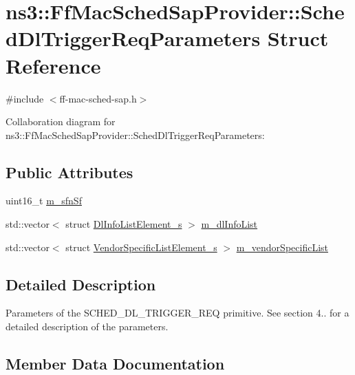 \hypertarget{structns3_1_1FfMacSchedSapProvider_1_1SchedDlTriggerReqParameters}{}\section{ns3\+:\+:Ff\+Mac\+Sched\+Sap\+Provider\+:\+:Sched\+Dl\+Trigger\+Req\+Parameters Struct Reference}
\label{structns3_1_1FfMacSchedSapProvider_1_1SchedDlTriggerReqParameters}


{\ttfamily \#include $<$ff-\/mac-\/sched-\/sap.\+h$>$}



Collaboration diagram for ns3\+:\+:Ff\+Mac\+Sched\+Sap\+Provider\+:\+:Sched\+Dl\+Trigger\+Req\+Parameters\+:
\subsection*{Public Attributes}
\begin{DoxyCompactItemize}
\item 
uint16\+\_\+t \hyperlink{structns3_1_1FfMacSchedSapProvider_1_1SchedDlTriggerReqParameters_a7689a56aa4563c5cc83b92f596ac43e8}{m\+\_\+sfn\+Sf}
\item 
std\+::vector$<$ struct \hyperlink{structns3_1_1DlInfoListElement__s}{Dl\+Info\+List\+Element\+\_\+s} $>$ \hyperlink{structns3_1_1FfMacSchedSapProvider_1_1SchedDlTriggerReqParameters_abe582862ee05e494899cfeb12787c2fc}{m\+\_\+dl\+Info\+List}
\item 
std\+::vector$<$ struct \hyperlink{structns3_1_1VendorSpecificListElement__s}{Vendor\+Specific\+List\+Element\+\_\+s} $>$ \hyperlink{structns3_1_1FfMacSchedSapProvider_1_1SchedDlTriggerReqParameters_a28e7bea1b166abc79bc26a53fd2d05af}{m\+\_\+vendor\+Specific\+List}
\end{DoxyCompactItemize}


\subsection{Detailed Description}
Parameters of the S\+C\+H\+E\+D\+\_\+\+D\+L\+\_\+\+T\+R\+I\+G\+G\+E\+R\+\_\+\+R\+EQ primitive. See section 4.. for a detailed description of the parameters. 

\subsection{Member Data Documentation}
